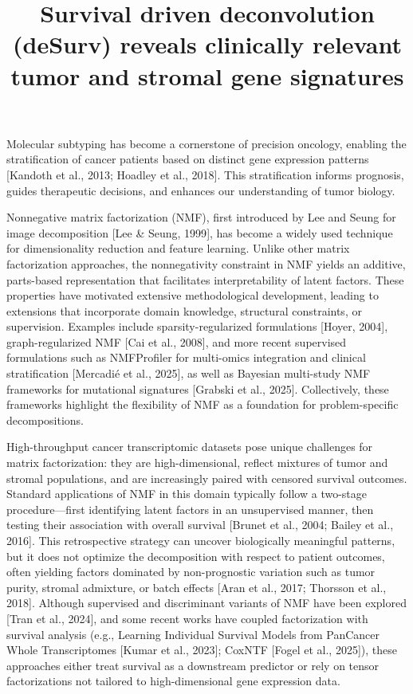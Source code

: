 \documentclass[
]{article}
\title{Survival driven deconvolution (deSurv) reveals clinically
relevant tumor and stromal gene signatures}
\author{}
\date{\vspace{-2.5em}}
\begin{document}
\maketitle

Molecular subtyping has become a cornerstone of precision oncology,
enabling the stratification of cancer patients based on distinct gene
expression patterns {[}Kandoth et al., 2013; Hoadley et al., 2018{]}.
This stratification informs prognosis, guides therapeutic decisions, and
enhances our understanding of tumor biology.

Nonnegative matrix factorization (NMF), first introduced by Lee and
Seung for image decomposition {[}Lee \& Seung, 1999{]}, has become a
widely used technique for dimensionality reduction and feature learning.
Unlike other matrix factorization approaches, the nonnegativity
constraint in NMF yields an additive, parts-based representation that
facilitates interpretability of latent factors. These properties have
motivated extensive methodological development, leading to extensions
that incorporate domain knowledge, structural constraints, or
supervision. Examples include sparsity-regularized formulations
{[}Hoyer, 2004{]}, graph-regularized NMF {[}Cai et al., 2008{]}, and
more recent supervised formulations such as NMFProfiler for multi-omics
integration and clinical stratification {[}Mercadié et al., 2025{]}, as
well as Bayesian multi-study NMF frameworks for mutational signatures
{[}Grabski et al., 2025{]}. Collectively, these frameworks highlight the
flexibility of NMF as a foundation for problem-specific decompositions.

High-throughput cancer transcriptomic datasets pose unique challenges
for matrix factorization: they are high-dimensional, reflect mixtures of
tumor and stromal populations, and are increasingly paired with censored
survival outcomes. Standard applications of NMF in this domain typically
follow a two-stage procedure---first identifying latent factors in an
unsupervised manner, then testing their association with overall
survival {[}Brunet et al., 2004; Bailey et al., 2016{]}. This
retrospective strategy can uncover biologically meaningful patterns, but
it does not optimize the decomposition with respect to patient outcomes,
often yielding factors dominated by non-prognostic variation such as
tumor purity, stromal admixture, or batch effects {[}Aran et al., 2017;
Thorsson et al., 2018{]}. Although supervised and discriminant variants
of NMF have been explored {[}Tran et al., 2024{]}, and some recent works
have coupled factorization with survival analysis (e.g., Learning
Individual Survival Models from PanCancer Whole Transcriptomes {[}Kumar
et al., 2023{]}; CoxNTF {[}Fogel et al., 2025{]}), these approaches
either treat survival as a downstream predictor or rely on tensor
factorizations not tailored to high-dimensional gene expression data.
\end{document}
